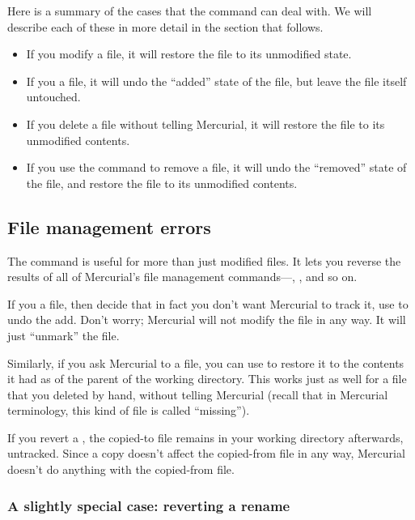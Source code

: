 Here is a summary of the cases that the  command can
deal with.  We will describe each of these in more detail in the
section that follows.
\begin{itemize}
\item If you modify a file, it will restore the file to its unmodified
  state.
\item If you  a file, it will undo the ``added'' state of
  the file, but leave the file itself untouched.
\item If you delete a file without telling Mercurial, it will restore
  the file to its unmodified contents.
\item If you use the  command to remove a file, it will
  undo the ``removed'' state of the file, and restore the file to its
  unmodified contents.
\end{itemize}

\subsection{File management errors}
\label{sec:undo:mgmt}

The  command is useful for more than just modified
files.  It lets you reverse the results of all of Mercurial's file
management commands---, , and so on.

If you  a file, then decide that in fact you don't want
Mercurial to track it, use  to undo the add.  Don't
worry; Mercurial will not modify the file in any way.  It will just
``unmark'' the file.

Similarly, if you ask Mercurial to  a file, you can use
 to restore it to the contents it had as of the parent
of the working directory.
This works just as well for a file that you deleted by hand, without
telling Mercurial (recall that in Mercurial terminology, this kind of
file is called ``missing'').

If you revert a , the copied-to file remains in your
working directory afterwards, untracked.  Since a copy doesn't affect
the copied-from file in any way, Mercurial doesn't do anything with
the copied-from file.

\subsubsection{A slightly special case: reverting a rename}

